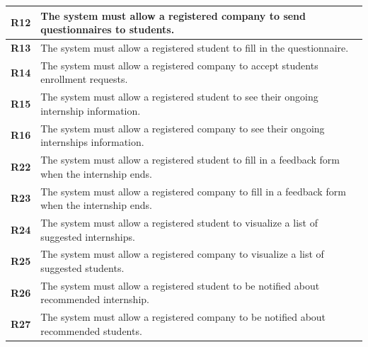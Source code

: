 \begin{table}[H]
\begin{tabular}{|l|m{10cm}|}
        \hline \textbf{R12} & The system must allow a registered company to send questionnaires to students. \\
        \hline \textbf{R13} & The system must allow a registered student to fill in the questionnaire. \\
        \hline \textbf{R14} & The system must allow a registered company to accept students enrollment requests. \\
        \hline \textbf{R15} & The system must allow a registered student to see their ongoing internship information. \\
        \hline \textbf{R16} & The system must allow a registered company to see their ongoing internships information. \\
        \hline \textbf{R22} & The system must allow a registered student to fill in a feedback form when the internship ends. \\
        \hline \textbf{R23} & The system must allow a registered company to fill in a feedback form when the internship ends. \\
        \hline \textbf{R24} & The system must allow a registered student to visualize a list of suggested internships. \\
        \hline \textbf{R25} & The system must allow a registered company to visualize a list of suggested students. \\
        \hline \textbf{R26} & The system must allow a registered student to be notified about recommended internship. \\
        \hline \textbf{R27} & The system must allow a registered company to be notified about recommended students. \\
        \hline
    \end{tabular}
\end{table}

